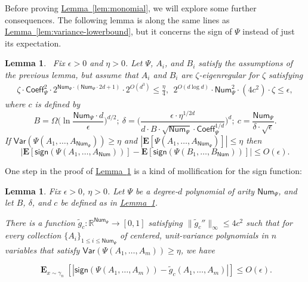 \documentclass[11pt]{article}
\numberwithin{equation}{section}
\newtheorem{lemma}[theorem]{Lemma}
\theoremstyle{definition}
\theoremstyle{plain}
\newcommand{\expref}[2]{\hyperref[#2]{#1~\ref{#2}}}
\begin{document}
Before proving \expref{Lemma}{lem:monomial}, we will explore some further consequences.
The following lemma is along the same lines as \expref{Lemma}{lem:variance-lowerbound},
but it concerns the sign of $\Psi$ instead of just its expectation.

\begin{lemma}~\label{lem:sign-match}
    Fix $\epsilon > 0$ and $\eta > 0$.
    Let $\Psi$, $A_i$, and $B_i$ satisfy the assumptions of the previous lemma, but
    assume that $A_i$ and $B_i$ are $\zeta$-eigenregular for $\zeta$ satisfying
    \begin{eqnarray*}
    \zeta \cdot \mathsf{Coeff}^2_\Psi \cdot 2^{\mathsf{Num}_\Psi \cdot (\mathsf{Num}_\Psi \cdot 2d+1)} \cdot 2^{O(d^3)} \leq \frac{\eta}{4} , \ \ 
     2^{O(d \log d)} \cdot \mathsf{Num}_{\Psi}^2 \cdot (4c^2) \cdot \zeta \le \epsilon,
    \end{eqnarray*}
    where $c$ is defined by
    \[
    B = \Omega\bigg( \ln  \frac{\mathsf{Num}_\Psi \cdot d}{\epsilon} \bigg)^{d/2} ;  \ \delta = \bigg( \frac{\epsilon \cdot \eta^{1/2d}}{d \cdot B \cdot \sqrt{\mathsf{Num}_\Psi} \cdot \mathsf{Coeff}_\Psi^{1/d}} \bigg)^d; \   c = \frac{\mathsf{Num}_{\Psi}}{\delta \cdot \sqrt{\epsilon}}.
    \]
    If $\mathsf{Var}(\Psi(A_1, \ldots,
    A_{\mathsf{Num}_\Psi})) \ge \eta$ and $|\mathbf{E}[\Psi(A_1, \ldots,
    A_{\mathsf{Num}_\Psi})]| \le \eta$ then
    \[
        |\mathbf{E}[\mathsf{sign}(\Psi(A_1, \ldots, A_{\mathsf{Num}}))] - \mathbf{E}[\mathsf{sign}(\Psi(B_1, \ldots, B_{\mathsf{Num}}))]| \le O(\epsilon).
    \]
\end{lemma}

One step in the proof of \expref{Lemma}{lem:sign-match} is a kind of mollification for the sign function:

\begin{lemma}\label{lem:mollification}
    Fix $\epsilon > 0$, $\eta > 0$. Let $\Psi$ be a degree-$d$ polynomial of
    arity $\mathsf{Num}_\Psi$, and
    let $B$, $\delta$, and $c$ be defined as in \expref{Lemma}{lem:sign-match}.

    There is a function $\tilde{g}_c: \mathbb{R}^{\mathsf{Num}_\Psi}
    \rightarrow [0,1]$ satisfying $\|\tilde g_c''\|_\infty \le 4 c^2$ such that
    for every collection $\{A_i\}_{1 \le i \le \mathsf{Num}_\Psi}$ of centered,
    unit-variance polynomials in $n$ variables that satisfy
    $\mathsf{Var}(\Psi(A_1, \ldots, A_m)) \ge \eta$, we have

\[
\mathop{\mathbf{E}}_{x \sim \gamma_n} [|\mathsf{sign}(\Psi(A_1, \ldots, A_m)) - \tilde{g}_c(A_1, \ldots, A_m)|] \le O(\epsilon). 
\]
\end{lemma}
\end{document}
